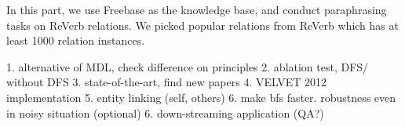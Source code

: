 In this part, we use Freebase as the knowledge base, and conduct paraphrasing tasks on 
ReVerb relations. We picked  popular relations from ReVerb which has at least
1000 relation instances.




1. alternative of MDL, check difference on principles
2. ablation test, DFS/ without DFS
3. state-of-the-art, find new papers
4. VELVET 2012 implementation
5. entity linking (self, others)
6. make bfs faster. robustness even in noisy situation
(optional) 6. down-streaming application (QA?)
